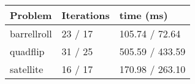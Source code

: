 \begin{tabular}{lll}
\toprule 
Problem & Iterations & time (ms) \\
\midrule 
barrellroll & 23 / 17 & 105.74 / 72.64 \\
quadflip & 31 / 25 & 505.59 / 433.59 \\
satellite & 16 / 17 & 170.98 / 263.10 \\
\bottomrule 
\end{tabular}
